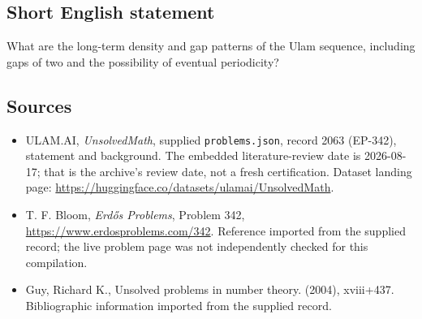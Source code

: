 \documentclass[11pt,a4paper]{article}
\begin{document}
\subsection{Short English statement}

What are the long-term density and gap patterns of the Ulam sequence, including gaps of two and the possibility of eventual periodicity?

\subsection{Sources}

{\small

\begin{itemize}

\item[\hypertarget{source:2063:1}{S1}] ULAM.AI, \emph{UnsolvedMath}, supplied \texttt{problems.json}, record 2063 (EP-342), statement and background. The embedded literature-review date is 2026-08-17; that is the archive’s review date, not a fresh certification. Dataset landing page: \url{https://huggingface.co/datasets/ulamai/UnsolvedMath}.

\item[\hypertarget{source:2063:2}{S2}] T. F. Bloom, \emph{Erdős Problems}, Problem 342, \url{https://www.erdosproblems.com/342}. Reference imported from the supplied record; the live problem page was not independently checked for this compilation.

\item[\hypertarget{source:2063:3}{S3}] Guy, Richard K., Unsolved problems in number theory. (2004), xviii+437. Bibliographic information imported from the supplied record.

\end{itemize}

}

\label{end:2063}
\end{document}
